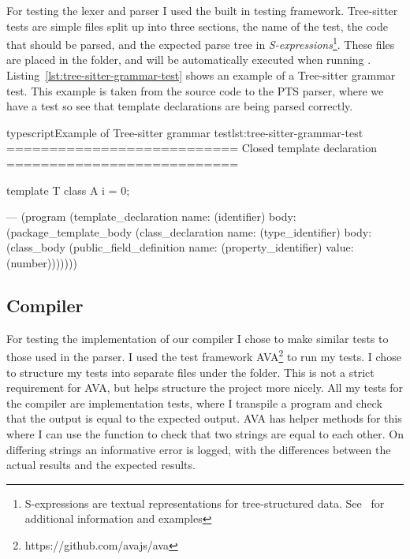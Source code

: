For testing the lexer and parser I used the built in testing framework.
Tree-sitter tests are simple  files split up into three sections, the name of the test, the code that should be parsed, and the expected parse tree in \textit{S-expressions}\footnote{S-expressions are textual representations for tree-structured data. See~\cite{sexprs} for additional information and examples}.
These files are placed in the  folder, and will be automatically executed when running .
Listing~\vref{lst:tree-sitter-grammar-test} shows an example of a Tree-sitter grammar test.
This example is taken from the source code to the PTS parser, where we have a test so see that template declarations are being parsed correctly.

\begin{code}{typescript}{Example of Tree-sitter grammar test}{lst:tree-sitter-grammar-test}
    ===========================
    Closed template declaration
    ===========================

    template T {
        class A {
            i = 0;
        }
    }

    ---
    (program
        (template_declaration
            name: (identifier)
            body: (package_template_body
                    (class_declaration
                        name: (type_identifier)
                        body: (class_body
                            (public_field_definition
                                name: (property_identifier)
                                value: (number)))))))

\end{code}

\subsection{Compiler}\label{subsec:testing-transpiler}

For testing the implementation of our compiler I chose to make similar tests to those used in the parser.
I used the test framework AVA\footnote{https://github.com/avajs/ava} to run my tests.
I chose to structure my tests into separate files under the  folder.
This is not a strict requirement for AVA, but helps structure the project more nicely.
All my tests for the compiler are implementation tests, where I transpile a program and check that the output is equal to the expected output.
AVA has helper methods for this where I can use the  function to check that two strings are equal to each other.
On differing strings an informative error is logged, with the differences between the actual results and the expected results.

